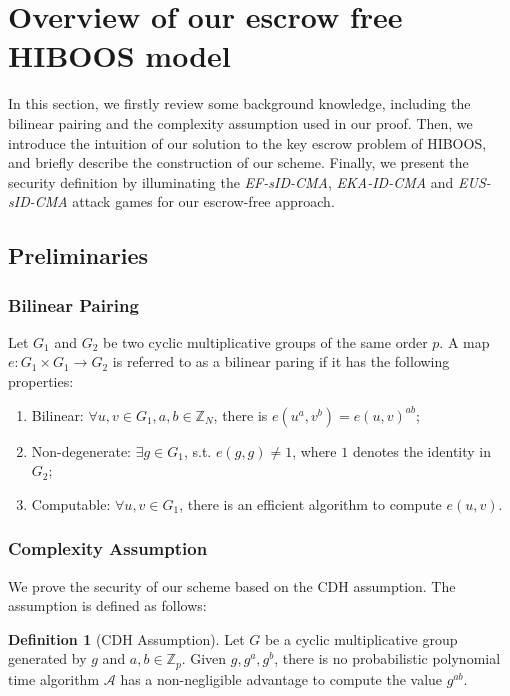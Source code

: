 \documentclass[times]{secauth}
\theoremstyle{definition}
\newtheorem{definition}[theorem]{Definition}
\theoremstyle{remark}
\begin{document}
\section{Overview of our escrow free HIBOOS model}\label{sec-overview}
In this section, we firstly review some background knowledge, including the bilinear pairing and the complexity assumption used in our proof.
Then, we introduce the intuition of our solution to the key escrow problem of HIBOOS, and briefly describe the construction of our scheme. 
Finally, we present the security definition by illuminating the \emph{EF-sID-CMA}, \emph{EKA-ID-CMA} and \emph{EUS-sID-CMA} attack games for our escrow-free approach.

\subsection{Preliminaries}\label{sec-Pre}
\subsubsection{Bilinear Pairing}\label{sec-bilinearpairing}
Let $G_1$ and $G_2$ be two cyclic multiplicative groups of the same order $p$. 
A map $e: G_1 \times G_1 \rightarrow G_2$ is referred to as a bilinear paring if it has the following properties: 
\begin{enumerate}[1.]
\item Bilinear: $\forall u,v \in G_1, a,b \in \mathbb{Z}_N$, there is $e(u^a, v^b) = e(u,v)^{ab} $;
\item Non-degenerate: $\exists g \in G_1$, s.t. $e(g,g) \neq 1$, where $1$ denotes the identity in $G_2$;
\item Computable: $\forall u, v \in G_1$, there is an efficient algorithm to compute $e(u,v)$.
\end{enumerate}

\subsubsection{Complexity Assumption}
We prove the security of our scheme based on the CDH assumption. 
The assumption is defined as follows: 
\begin{definition}[CDH Assumption]
Let $G$ be a cyclic multiplicative group generated by $g$ and $a, b \in \mathbb{Z}_p$.
Given $g, g^a, g^b$, there is no probabilistic polynomial time algorithm $\mathcal{A}$ has a non-negligible advantage to compute the value $g^{ab}$.
\end{definition}
\end{document}
